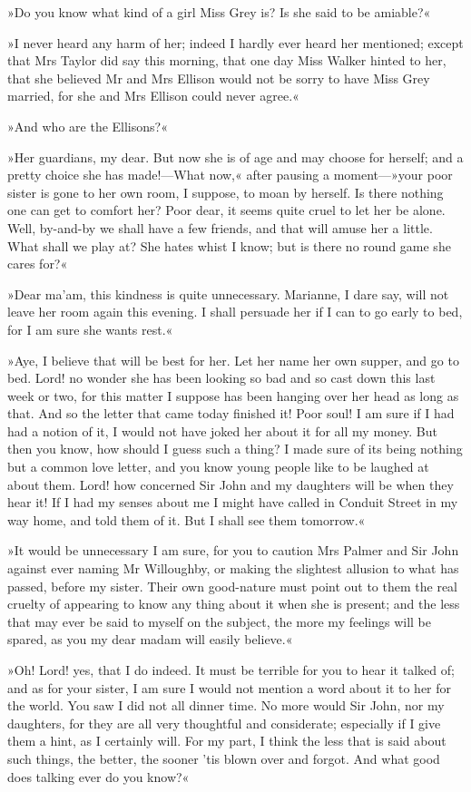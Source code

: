 »Do you know what kind of a girl Miss Grey is? Is she said to be amiable?«

»I never heard any harm of her; indeed I hardly ever heard her mentioned; except that Mrs Taylor did say this morning, that one day Miss Walker hinted to her, that she believed Mr and Mrs Ellison would not be sorry to have Miss Grey married, for she and Mrs Ellison could never agree.«

»And who are the Ellisons?«

»Her guardians, my dear. But now she is of age and may choose for herself; and a pretty choice she has made!—What now,« after pausing a moment—»your poor sister is gone to her own room, I suppose, to moan by herself. Is there nothing one can get to comfort her? Poor dear, it seems quite cruel to let her be alone. Well, by-and-by we shall have a few friends, and that will amuse her a little. What shall we play at? She hates whist I know; but is there no round game she cares for?«

»Dear ma’am, this kindness is quite unnecessary. Marianne, I dare say, will not leave her room again this evening. I shall persuade her if I can to go early to bed, for I am sure she wants rest.«

»Aye, I believe that will be best for her. Let her name her own supper, and go to bed. Lord! no wonder she has been looking so bad and so cast down this last week or two, for this matter I suppose has been hanging over her head as long as that. And so the letter that came today finished it! Poor soul! I am sure if I had had a notion of it, I would not have joked her about it for all my money. But then you know, how should I guess such a thing? I made sure of its being nothing but a common love letter, and you know young people like to be laughed at about them. Lord! how concerned Sir John and my daughters will be when they hear it! If I had my senses about me I might have called in Conduit Street in my way home, and told them of it. But I shall see them tomorrow.«

»It would be unnecessary I am sure, for you to caution Mrs Palmer and Sir John against ever naming Mr Willoughby, or making the slightest allusion to what has passed, before my sister. Their own good-nature must point out to them the real cruelty of appearing to know any thing about it when she is present; and the less that may ever be said to myself on the subject, the more my feelings will be spared, as you my dear madam will easily believe.«

»Oh! Lord! yes, that I do indeed. It must be terrible for you to hear it talked of; and as for your sister, I am sure I would not mention a word about it to her for the world. You saw I did not all dinner time. No more would Sir John, nor my daughters, for they are all very thoughtful and considerate; especially if I give them a hint, as I certainly will. For my part, I think the less that is said about such things, the better, the sooner ’tis blown over and forgot. And what good does talking ever do you know?«

